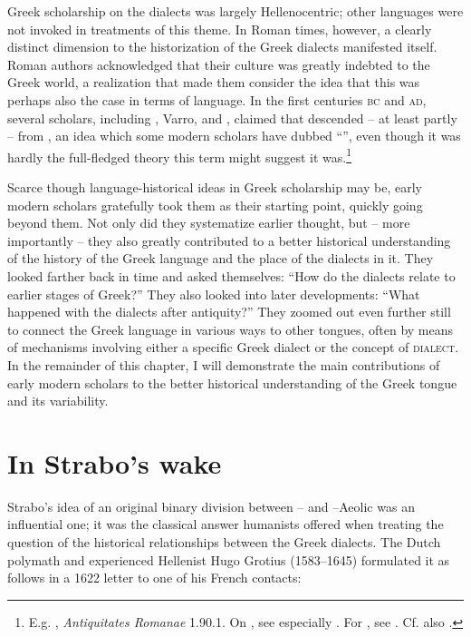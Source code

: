 Greek scholarship on the dialects was largely Hellenocentric; other languages were not invoked in treatments of this theme. In Roman times, however, a clearly distinct dimension to the historization of the Greek dialects manifested itself. Roman authors acknowledged that their culture was greatly indebted to the Greek world, a realization that made them consider the idea that this was perhaps also the case in terms of language. In the first centuries \textsc{bc} and \textsc{ad}, several scholars, including , Varro, and , claimed that  descended – at least partly – from , an idea which some modern scholars have dubbed “”, even though it was hardly the full-fledged theory this term might suggest it was.\footnote{E.g. , \textit{Antiquitates Romanae} 1.90.1. On , see especially \citet[]{Stevens2006}. For , see \citet[149]{Fogen2000}. Cf. also \citet[117--119]{Schopsdau1992}.}

Scarce though language-historical ideas in Greek scholarship may be, early modern scholars gratefully took them as their starting point, quickly going beyond them. Not only did they systematize earlier thought, but – more importantly – they also greatly contributed to a better historical understanding of the history of the Greek language and the place of the dialects in it. They looked farther back in time and asked themselves: “How do the dialects relate to earlier stages of Greek?” They also looked into later developments: “What happened with the dialects after antiquity?” They zoomed out even further still to connect the Greek language in various ways to other tongues, often by means of mechanisms involving either a specific Greek dialect or the concept of \textsc{dialect}. In the remainder of this chapter, I will demonstrate the main contributions of early modern scholars to the better historical understanding of the Greek tongue and its variability.

\section{In Strabo’s wake}\label{sec:5.2}

Strabo’s idea of an original binary division between – and –Ae\-ol\-ic was an influential one; it was the classical answer humanists offered when treating the question of the historical relationships between the Greek dialects. The Dutch polymath and experienced Hellenist Hugo Grotius (1583–1645) formulated it as follows in a 1622 letter to one of his French contacts:

